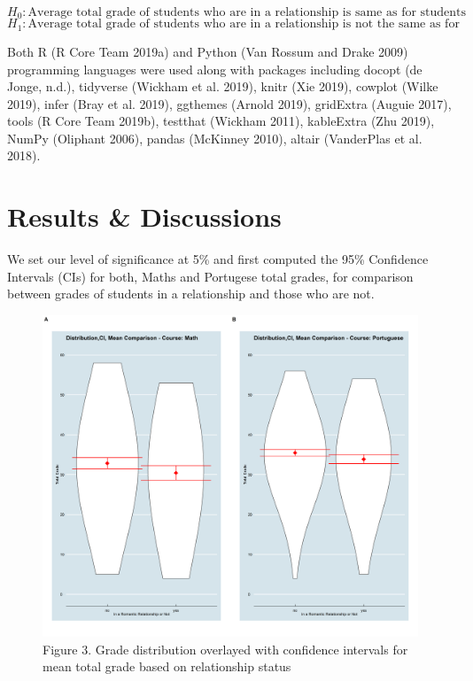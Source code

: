 \documentclass[]{article}
\begin{document}
\[H_0: \text{Average total grade of students who are in a relationship is same as for students who are not in a relationship}\]
\[H_1: \text{Average total grade of students who are in a relationship is not the same as for students who are not in a relationship}\]

Both R (R Core Team 2019a) and Python (Van Rossum and Drake 2009)
programming languages were used along with packages including docopt (de
Jonge, n.d.), tidyverse (Wickham et al. 2019), knitr (Xie 2019), cowplot
(Wilke 2019), infer (Bray et al. 2019), ggthemes (Arnold 2019),
gridExtra (Auguie 2017), tools (R Core Team 2019b), testthat (Wickham
2011), kableExtra (Zhu 2019), NumPy (Oliphant 2006), pandas (McKinney
2010), altair (VanderPlas et al. 2018).

\hypertarget{results-discussions}{%
\section{Results \& Discussions}\label{results-discussions}}

We set our level of significance at 5\% and first computed the 95\%
Confidence Intervals (CIs) for both, Maths and Portugese total grades,
for comparison between grades of students in a relationship and those
who are not.

\begin{figure}

{\centering \includegraphics[width=0.8\linewidth]{../results/figures/distribution_mean_ci_comparison} 

}

\caption{Figure 3. Grade distribution overlayed with confidence intervals for mean total grade based on relationship status}\label{fig:ci_over_plot}
\end{figure}
\end{document}
